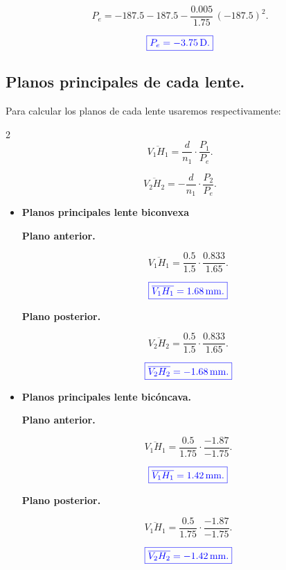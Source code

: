 \documentclass[a4paper,12pt]{article} %
\begin{document}
\[P_e = -187.5 -187.5 - \frac{0.005}{1.75} \, \left(-187.5\right)^2.\]

\[\textcolor{blue}{\boxed{P_e = -3.75 \, \mathrm{D}.}}\]

\vspace{\baselineskip}

\subsection{Planos principales de cada lente.}

\begin{justify}
	Para calcular los planos de cada lente usaremos respectivamente:
\end{justify}

\begin{multicols}{2}
	\[\overline{V_1 H_1} = \frac{d}{n_1} \cdot \frac{P_1}{P_e}.\]
	
	\[\overline{V_2 H_2} = -\frac{d}{n_1} \cdot \frac{P_2}{P_e}.\]
\end{multicols}


\begin{itemize}
	\item \textbf{Planos principales lente biconvexa}
	
	\textbf{Plano anterior.} 

	\[\overline{V_1 H_1} = \frac{0.5}{1.5} \cdot \frac{0.833}{1.65}.\]

	\[\textcolor{blue}{\boxed{\overline{V_1 H_1} = 1.68 \, \mathrm{mm}.}}\]

	\textbf{Plano posterior.} 

	\[\overline{V_2 H_2} = \frac{0.5}{1.5} \cdot \frac{0.833}{1.65}.\]

	\[\textcolor{blue}{\boxed{\overline{V_2 H_2} = -1.68 \, \mathrm{mm}.}}\]

	\vspace{\baselineskip}

	\item \textbf{Planos principales lente bicóncava.}
	
	\textbf{Plano anterior.} 

	\[\overline{V_1 H_1} = \frac{0.5}{1.75} \cdot \frac{-1.87}{-1.75}.\]

	\[\textcolor{blue}{\boxed{\overline{V_1 H_1} = 1.42 \, \mathrm{mm}.}}\]

	\textbf{Plano posterior.} 

	\[\overline{V_1 H_1} = \frac{0.5}{1.75} \cdot \frac{-1.87}{-1.75}.\]

	\[\textcolor{blue}{\boxed{\overline{V_2 H_2} = -1.42 \, \mathrm{mm}.}}\]
\end{itemize}
\end{document}
